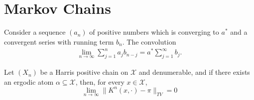 \section{Markov Chains}
\begin{prp}
Consider a sequence $(a_n)$ of positive numbers which is converging to $a^*$ and a convergent series with running term $b_n$. The convolution 
\begin{align*}
    \lim_{n \rightarrow \infty} \sum_{j=1}^{n}a_j b_{n-j} = a^* \sum_{j=1}^{\infty}b_j.
\end{align*}
    
\end{prp}

\begin{thm}
Let $(X_n)$ be a Harris positive chain on $\mathcal{X}$ and denumerable, and  if there exists an ergodic atom $\alpha \subseteq \mathcal{X}$, then, for every $x \in \mathcal{X}$,
\begin{equation*}
    \lim_{n \rightarrow \infty} \| K^n(x,\cdot) - \pi \|_{TV} = 0
\end{equation*}
\end{thm}
